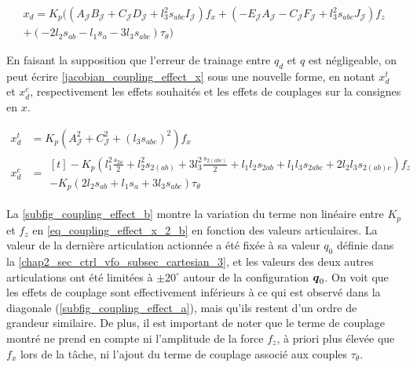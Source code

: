 \begin{appendices}
	
	\begin{multline}  \label{jacobian_coupling_effect_x}
		x_d = K_p \big(
		(A_\mathcal{J} B_\mathcal{J} + C_\mathcal{J} D_\mathcal{J} + l_3^2 s_{abc} I_\mathcal{J}) f_x +
		(-E_\mathcal{J} A_\mathcal{J} - C_\mathcal{J} F_\mathcal{J} + l_3^2 s_{abc} J_\mathcal{J}) f_z\\
		+ (-2 l_2 s_{ab} - l_1 s_{a} - 3 l_3 s_{abc}) \tau_\theta \big)
	\end{multline}
	
	
	En faisant la supposition que l'erreur de trainage entre $ q_d $ et $ q $ est négligeable, on peut écrire \cref{jacobian_coupling_effect_x} sous une nouvelle forme, en notant $ x_d^t $ et $ x_d^c $, respectivement les effets souhaités et les effets de couplages sur la consignes en $ x $.
	
	\begin{align} \label{eq_coupling_effect_x_2}
		x_d^t &= K_p (A_\mathcal{J}^2 + C_\mathcal{J}^2 + (l_3 s_{abc})^2) f_x \\
		x_d^c & = \begin{multlined}[t]
			-K_p \left( l_1^2 \frac{s_{2a}}{2} + l_2^2 s_{2(ab)} + 3 l_3^2  \frac{s_{2(abc)}}{2} + l_1 l_2 s_{2ab} + l_1 l_3 s_{2abc} + 2 l_2 l_3 s_{2(ab)c} \right) f_z \\
			- K_p \left(2 l_2 s_{ab} + l_1 s_{a} + 3 l_3 s_{abc} \right) \tau_\theta
		\end{multlined}\label{eq_coupling_effect_x_2_b}
	\end{align}
	
	La \cref{subfig_coupling_effect_b} montre la variation du terme non linéaire entre $ K_p $ et $ f_z $ en \cref{eq_coupling_effect_x_2_b} en fonction des valeurs articulaires. La valeur de la dernière articulation actionnée a été fixée à sa valeur $ q_0 $ définie dans la \cref{chap2_sec_ctrl_vfo_subsec_cartesian_3}, et les valeurs des deux autres articulations ont été limitées à $ \pm20^\circ $ autour de la configuration $ \vect{q}_0 $. On voit que les effets de couplage sont effectivement inférieurs à ce qui est observé dans la diagonale (\cref{subfig_coupling_effect_a}), mais qu'ils restent d'un ordre de grandeur similaire. De plus, il est important de noter que le terme de couplage montré ne prend en compte ni l'amplitude de la force $ f_z $, à priori plus élevée que $ f_x $ lors de la tâche, ni l'ajout du terme de couplage associé aux couples $ \tau_\theta $. 
	
	
	

\end{appendices}
